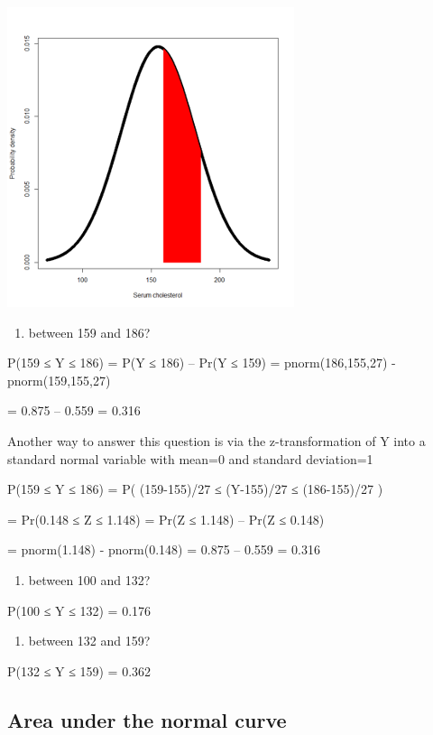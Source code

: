 \documentclass[
]{book}
\providecommand{\tightlist}{%
  \setlength{\itemsep}{0pt}\setlength{\parskip}{0pt}}
\begin{document}
\includegraphics[width=0.5\linewidth]{./2_54}

\begin{enumerate}
\def\labelenumi{\alph{enumi})}
\setcounter{enumi}{4}
\tightlist
\item
  between 159 and 186?
\end{enumerate}

P(159 ≤ Y ≤ 186)
= P(Y ≤ 186) -- Pr(Y ≤ 159)
= pnorm(186,155,27)
- pnorm(159,155,27)

= 0.875 -- 0.559
= 0.316

Another way to answer this question is via the z-transformation of Y into a standard normal variable with mean=0 and standard deviation=1

P(159 ≤ Y ≤ 186)
= P( (159-155)/27 ≤ (Y-155)/27 ≤ (186-155)/27 )

= Pr(0.148 ≤ Z ≤ 1.148)
= Pr(Z ≤ 1.148) -- Pr(Z ≤ 0.148)

= pnorm(1.148) - pnorm(0.148)
= 0.875 -- 0.559
= 0.316

\begin{enumerate}
\def\labelenumi{\alph{enumi})}
\setcounter{enumi}{4}
\tightlist
\item
  between 100 and 132?
\end{enumerate}

P(100 ≤ Y ≤ 132) = 0.176

\begin{enumerate}
\def\labelenumi{\alph{enumi})}
\setcounter{enumi}{5}
\tightlist
\item
  between 132 and 159?
\end{enumerate}

P(132 ≤ Y ≤ 159) = 0.362

\hypertarget{area-under-the-normal-curve-1}{%
\subsection{Area under the normal curve}\label{area-under-the-normal-curve-1}}
\end{document}
